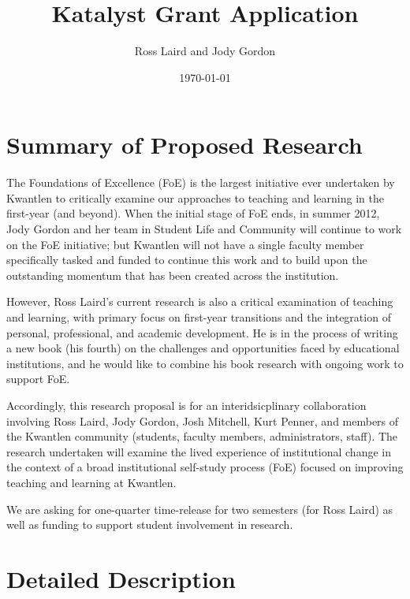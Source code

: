 \documentclass[letterpaper,10pt,headsepline]{scrreprt}
\author{Ross Laird and Jody Gordon}
\title{Katalyst Grant Application}
\date{\today}
\begin{document}
\begin{titlingpage}
\begin{center}
\maketitle
\end{center}
\end{titlingpage}
\setcounter{tocdepth}{3}
\tableofcontents

\vspace*{1cm}
\section{Summary of Proposed Research}
\label{sec-1}

The Foundations of Excellence (FoE) is the largest initiative ever undertaken
by Kwantlen to critically examine our approaches to teaching and learning in
the first-year (and beyond). When the initial stage of FoE ends, in summer
2012, Jody Gordon and her team in Student Life and Community will continue to
work on the FoE initiative; but Kwantlen will not have a single faculty member
specifically tasked and funded to continue this work and to build upon the
outstanding momentum that has been created across the institution.


However, Ross Laird's current research is also a critical examination of
teaching and learning, with primary focus on first-year transitions and the
integration of personal, professional, and academic development. He is in the
process of writing a new book (his fourth) on the challenges and opportunities
faced by educational institutions, and he would like to combine his book
research with ongoing work to support FoE.

Accordingly, this research proposal is for an interidsicplinary collaboration
involving Ross Laird, Jody Gordon, Josh Mitchell, Kurt Penner, and members of
the Kwantlen community (students, faculty members, administrators, staff). The
research undertaken will examine the lived experience of institutional change
in the context of a broad institutional self-study process (FoE) focused on
improving teaching and learning at Kwantlen.

We are asking for one-quarter time-release for two semesters (for Ross Laird) as well as funding to support student involvement in research.


\section{Detailed Description}
\end{document}
